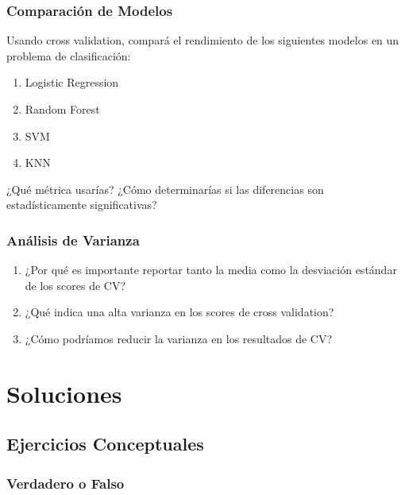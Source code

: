 \documentclass[12pt]{article}
\begin{document}
\subsubsection{Comparación de Modelos}

Usando cross validation, compará el rendimiento de los siguientes modelos en un problema de clasificación:

\begin{enumerate}
    \item Logistic Regression
    \item Random Forest
    \item SVM
    \item KNN
\end{enumerate}

¿Qué métrica usarías? ¿Cómo determinarías si las diferencias son estadísticamente significativas?

\subsubsection{Análisis de Varianza}

\begin{enumerate}
    \item ¿Por qué es importante reportar tanto la media como la desviación estándar de los scores de CV?
    \item ¿Qué indica una alta varianza en los scores de cross validation?
    \item ¿Cómo podríamos reducir la varianza en los resultados de CV?
\end{enumerate}

\newpage

\section{Soluciones}

\subsection{Ejercicios Conceptuales}

\subsubsection{Verdadero o Falso}
\end{document}
